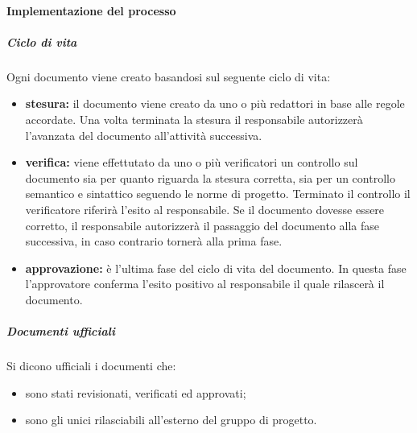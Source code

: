 			\paragraph{Implementazione del processo}
				\subparagraph{Ciclo di vita}
					Ogni documento viene creato basandosi sul seguente ciclo di vita:
					\begin{itemize}
					\item \textbf{stesura:} il documento viene creato da uno o più redattori in base alle regole accordate. Una volta terminata la stesura il responsabile autorizzerà l'avanzata del documento all'attività successiva.
					\item \textbf{verifica:} viene effettutato da uno o più verificatori un controllo sul documento sia per quanto riguarda la stesura corretta, sia per un controllo semantico e sintattico seguendo le norme di progetto. Terminato il controllo il verificatore riferirà l'esito al responsabile. Se il documento dovesse essere corretto, il responsabile autorizzerà il passaggio del documento alla fase successiva, in caso contrario tornerà alla prima fase.
					\item \textbf{approvazione:} è l'ultima fase del ciclo di vita del documento. In questa fase l'approvatore conferma l'esito positivo al responsabile il quale rilascerà il documento. 
					\end{itemize}
				\subparagraph{Documenti ufficiali}
					Si dicono ufficiali i documenti che:
					\begin{itemize}
						\item sono stati revisionati, verificati ed approvati;
						\item sono gli unici rilasciabili all'esterno del gruppo di progetto.
					\end{itemize}
					
